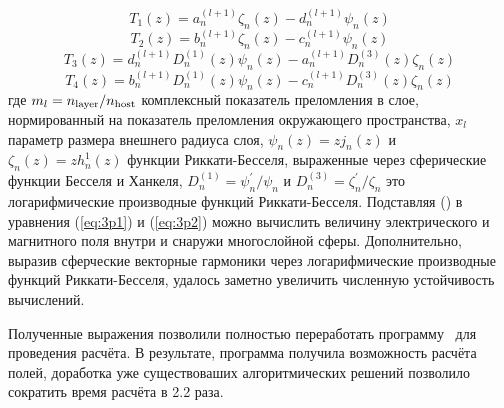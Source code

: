 \begin{equation*}
  T_1(z) =   a^{(l+1)}_{n}  \zeta_{n}(z) 
           - d^{(l+1)}_{n}  \psi_{n}(z)
\end{equation*}
\begin{equation*}
  T_2(z) =   b^{(l+1)}_{n}  \zeta_{n}(z) 
           - c^{(l+1)}_{n}  \psi_{n}(z)
\end{equation*}
\begin{equation*}
  T_3(z) =  d^{(l+1)}_{n}  D^{(1)}_{n}(z)  \psi_{n}(z) 
          - a^{(l+1)}_{n}  D^{(3)}_{n}(z)  \zeta_{n} (z)
\end{equation*}
\begin{equation*}
  T_4(z) =  b^{(l+1)}_{n}  D^{(1)}_{n}(z)  \psi_{n}(z) 
          - c^{(l+1)}_{n}  D^{(3)}_{n}(z)  \zeta_{n} (z)
\end{equation*}
где $m_l = n_{\rm layer}/n_{\rm host}$ комплексный показатель
преломления в слое, нормированный на показатель преломления
окружающего пространства, $x_l$ параметр размера внешнего радиуса
слоя, $\psi_{n}(z) = z j_n(z)$ и $\zeta_{n}(z) = z h_n^1(z)$ функции
Риккати-Бесселя, выраженные через сферические функции Бесселя и
Ханкеля, $D^{(1)}_{n} = \psi^{\prime}_{n}/\psi_{n}$ и
$D^{(3)}_{n} = \zeta^{\prime}_{n}/\zeta_{n}$ это логарифмические
производные функций Риккати-Бесселя. Подставляя
() в уравнения (\ref{eq:3p1}) и
(\ref{eq:3p2}) можно вычислить величину электрического и магнитного
поля внутри и снаружи многослойной сферы. Дополнительно, выразив
сферческие векторные гармоники через логарифмические производные
функций Риккати-Бесселя, удалось заметно увеличить численную
устойчивость вычислений.

Полученные выражения позволили полностью переработать
программу~\cite{Scattnlay-web} для проведения расчёта.  В результате,
программа получила возможность расчёта полей, доработка уже
существоваших алгоритмических решений позволило сократить время
расчёта в 2.2 раза.

